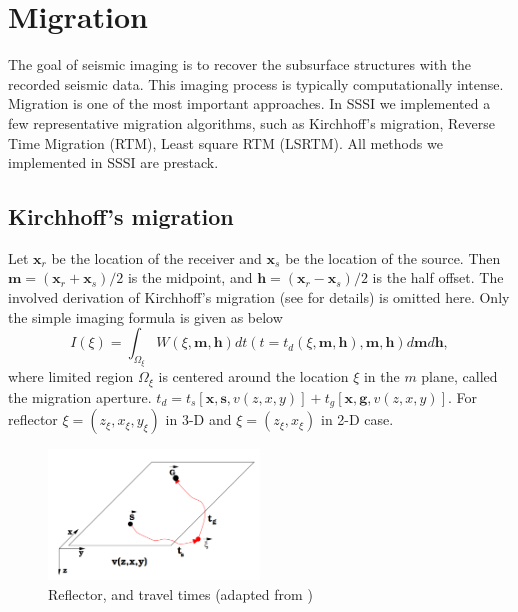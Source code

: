 \documentclass[11pt]{article}
\newcommand{\bx}{\boldsymbol{x}}
\newcommand{\bg}{\boldsymbol{g}}
\newcommand{\bh}{\boldsymbol{h}}
\newcommand{\bs}{\boldsymbol{s}}
\newcommand{\bm}{\boldsymbol{m}}
\theoremstyle{plain}
\theoremstyle{definition}
\theoremstyle{remark}
\numberwithin{equation}{section}
\begin{document}
\section{Migration}
The goal of seismic imaging is to recover the subsurface structures with the recorded seismic data. This imaging process is 
typically computationally intense. Migration is one of the most important approaches. In SSSI we implemented a few representative 
migration algorithms, such as
Kirchhoff's migration, Reverse Time Migration (RTM), Least square RTM (LSRTM).
All methods we implemented in SSSI are prestack.  


\subsection{Kirchhoff's migration}
Let $\bx_r$ be the location of the receiver and $\bx_s$ be the location of the source. 
Then $\bm=(\bx_r+\bx_s)/2$ is the midpoint, and $\bh=(\bx_r-\bx_s)/2$ is the half offset.
The involved derivation of Kirchhoff's migration (see \cite{Schneider:1978aa} for details) is omitted here. Only the simple imaging formula 
is given as below
\begin{equation}
\label{eq:kirchhoffImaging}
I(\xi)=\int_{\Omega_\xi} W(\xi,\bm,\bh)dt(t=t_d(\xi,
\bm,\bh),\bm,\bh)d\bm d\bh,
\end{equation}
where limited region $\Omega_\xi$ is centered around the location $\xi$
in the $m$ plane, called the migration aperture. $t_d=t_s[\bx,\bs,v(z,x,y)]+t_g[\bx,\bg,v(z,x,y)]$.
For reflector $\xi = (z_\xi, x_\xi, y_\xi)$ in 3-D and $\xi = (z_\xi, x_\xi)$ in 2-D case.

\begin{figure}[htbp]
\centering
\includegraphics[width=0.5\textwidth]{Fig/tstg.PNG}
\caption{Reflector, and travel times (adapted from \cite{Biondi:2006aa})}
\end{figure}
  
\end{document}
